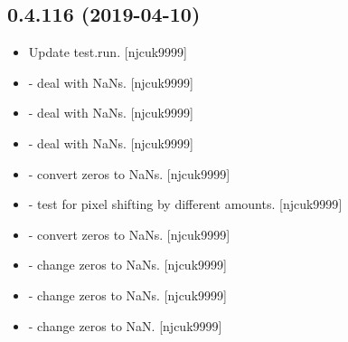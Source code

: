 \documentclass[a4paper,10pt,english]{report}
\begin{document}
\subsection{0.4.116 (2019-04-10)}
\label{\detokenize{misc/changelog:id145}}\begin{itemize}
\item {} 
Update test.run. {[}njcuk9999{]}

\item {} 
 - deal with NaNs. {[}njcuk9999{]}

\item {} 
 - deal with NaNs. {[}njcuk9999{]}

\item {} 
 - deal with NaNs. {[}njcuk9999{]}

\item {} 
 - convert zeros to NaNs. {[}njcuk9999{]}

\item {} 
 - test for pixel shifting by different amounts.
{[}njcuk9999{]}

\item {} 
 - convert zeros to NaNs. {[}njcuk9999{]}

\item {} 
 - change zeros to NaNs. {[}njcuk9999{]}

\item {} 
 - change zeros to NaNs. {[}njcuk9999{]}

\item {} 
 - change zeros to NaN. {[}njcuk9999{]}

\end{itemize}
\end{document}
